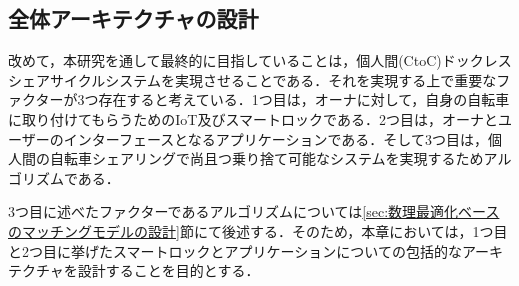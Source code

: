   \subsection{全体アーキテクチャの設計}
    \label{sec:全体アーキテクチャの設計}
      \par 改めて，本研究を通して最終的に目指していることは，個人間(CtoC)ドックレスシェアサイクルシステムを実現させることである．それを実現する上で重要なファクターが3つ存在すると考えている．1つ目は，オーナに対して，自身の自転車に取り付けてもらうためのIoT及びスマートロックである．2つ目は，オーナとユーザーのインターフェースとなるアプリケーションである．そして3つ目は，個人間の自転車シェアリングで尚且つ乗り捨て可能なシステムを実現するためアルゴリズムである．
      \par 3つ目に述べたファクターであるアルゴリズムについては\ref{sec:数理最適化ベースのマッチングモデルの設計}節にて後述する．そのため，本章においては，1つ目と2つ目に挙げたスマートロックとアプリケーションについての包括的なアーキテクチャを設計することを目的とする．

